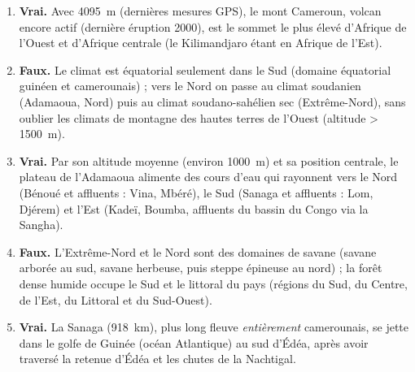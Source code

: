 \documentclass[11pt]{article}
\begin{document}
\begin{corrige}
\begin{enumerate}
\item \textbf{Vrai.} Avec \SI{4095}{m} (dernières mesures GPS), le mont Cameroun, volcan encore actif (dernière éruption 2000), est le sommet le plus élevé d'Afrique de l'Ouest et d'Afrique centrale (le Kilimandjaro étant en Afrique de l'Est).
\item \textbf{Faux.} Le climat est équatorial seulement dans le Sud (domaine équatorial guinéen et camerounais) ; vers le Nord on passe au climat soudanien (Adamaoua, Nord) puis au climat soudano-sahélien sec (Extrême-Nord), sans oublier les climats de montagne des hautes terres de l'Ouest (altitude > \SI{1500}{m}).
\item \textbf{Vrai.} Par son altitude moyenne (environ \SI{1000}{m}) et sa position centrale, le plateau de l'Adamaoua alimente des cours d'eau qui rayonnent vers le Nord (Bénoué et affluents : Vina, Mbéré), le Sud (Sanaga et affluents : Lom, Djérem) et l'Est (Kadeï, Boumba, affluents du bassin du Congo via la Sangha).
\item \textbf{Faux.} L'Extrême-Nord et le Nord sont des domaines de savane (savane arborée au sud, savane herbeuse, puis steppe épineuse au nord) ; la forêt dense humide occupe le Sud et le littoral du pays (régions du Sud, du Centre, de l'Est, du Littoral et du Sud-Ouest).
\item \textbf{Vrai.} La Sanaga (\SI{918}{km}), plus long fleuve \emph{entièrement} camerounais, se jette dans le golfe de Guinée (océan Atlantique) au sud d'Édéa, après avoir traversé la retenue d'Édéa et les chutes de la Nachtigal.
\end{enumerate}
\end{corrige}
\end{document}
